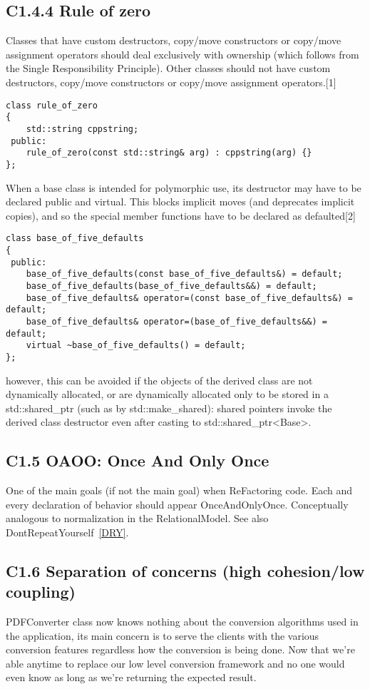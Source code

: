 \documentclass{book}
\begin{document}
\subsection{C1.4.4 Rule of zero}\label{ROZ}
Classes that have custom destructors, copy/move constructors or copy/move assignment operators should deal exclusively with ownership (which follows from the Single Responsibility Principle).
Other classes should not have custom destructors, copy/move constructors or copy/move assignment operators.[1]
\begin{lstlisting}
class rule_of_zero
{
    std::string cppstring;
 public:
    rule_of_zero(const std::string& arg) : cppstring(arg) {}
};
\end{lstlisting}
When a base class is intended for polymorphic use, its destructor may have to be declared public and virtual.
This blocks implicit moves (and deprecates implicit copies), and so the special member functions have to be declared as defaulted[2]
\begin{lstlisting}
class base_of_five_defaults
{
 public:
    base_of_five_defaults(const base_of_five_defaults&) = default;
    base_of_five_defaults(base_of_five_defaults&&) = default;
    base_of_five_defaults& operator=(const base_of_five_defaults&) = default;
    base_of_five_defaults& operator=(base_of_five_defaults&&) = default;
    virtual ~base_of_five_defaults() = default;
};
\end{lstlisting}
however, this can be avoided if the objects of the derived class are not dynamically allocated, or are dynamically allocated
only to be stored in a std::shared\_ptr (such as by std::make\_shared): shared pointers invoke the derived class destructor even after casting to std::shared\_ptr<Base>. 
\subsection{C1.5 OAOO: Once And Only Once}\label{OAOO}
One of the main goals (if not the main goal) when ReFactoring code. Each and every declaration of behavior should appear OnceAndOnlyOnce.
Conceptually analogous to normalization in the RelationalModel. See also DontRepeatYourself~\ref{DRY}. 
\subsection{C1.6 Separation of concerns (high cohesion/low coupling)}\label{SOC}
PDFConverter class now knows nothing about the conversion algorithms used in the application,
its main concern is to serve the clients with the various conversion features regardless how the conversion is being done.
Now that we’re able anytime to replace our low level conversion framework and no one would even know as long as we’re returning the expected result.
\end{document}
